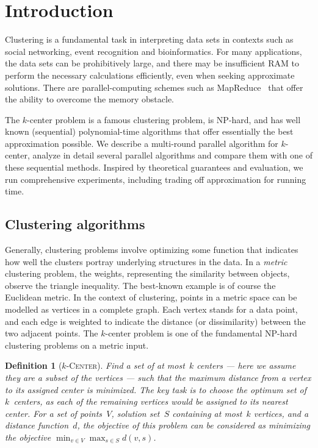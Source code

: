 \documentclass[11pt]{article}
\newtheorem*{definition}{Definition}
\begin{document}
\section{Introduction}

Clustering is a fundamental task in interpreting data sets in contexts such as social networking, event recognition and bioinformatics.
For many applications, the data sets can be prohibitively large, and there may be
insufficient RAM to perform the necessary calculations efficiently,
even when seeking approximate solutions. 
There are parallel-computing schemes such as MapReduce~\cite{dean2008mapreduce}
that offer the ability to overcome the memory obstacle.


The $k$-center problem is a famous clustering problem, is NP-hard, and has
well known (sequential) polynomial-time algorithms that offer essentially the best
approximation possible.
We describe a multi-round parallel algorithm for $k$-center, analyze in detail several
parallel algorithms and compare them with
one of these sequential methods.
Inspired by theoretical guarantees and evaluation, we run comprehensive
experiments, including trading off approximation for running time.

\subsection{Clustering algorithms}

Generally, clustering problems involve optimizing some function that indicates how well the clusters
portray underlying structures in the data.
In a \emph{metric} clustering problem, the
weights, representing the similarity between objects,
observe the triangle inequality.
The best-known example is of course the Euclidean metric.
In the context of clustering, points in a metric space can be modelled as vertices in a complete graph.
Each vertex stands for a data point, and each edge is weighted to
indicate the distance (or dissimilarity) between the two adjacent points.
The $k$-center problem is one of the fundamental NP-hard clustering problems on a metric input.



\begin{definition}[$k$-\textsc{Center}]
Find a set of at most~$k$ centers ---
here we assume they are a subset of the vertices ---
such that the maximum distance from a vertex to its assigned center
is minimized.
The key task is to choose the optimum set of $k$~centers, as each of the
remaining vertices would be assigned to its nearest center.
For a set of points~$V$, solution set~$S$ containing at most~$k$ vertices,
and a distance function~$d$, the objective of this problem can be considered as minimizing the objective $\min_{v\in V}\max_{s\in S}d(v, s)$.
\end{definition}	
\end{document}
